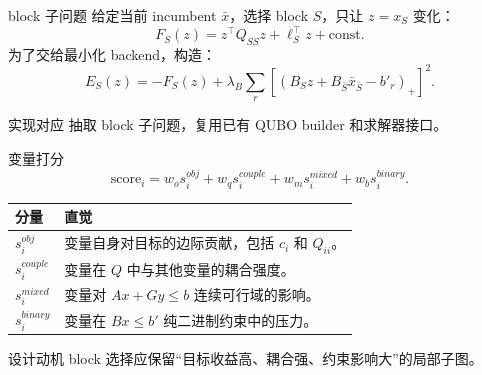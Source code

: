 \documentclass[aspectratio=169]{beamer}
\begin{document}
\begin{frame}{block 子问题}
\small
给定当前 incumbent $\bar{x}$，选择 block $S$，只让 $z=x_S$ 变化：
\[
F_S(z)=z^\top Q_{SS}z+\ell_S^\top z+\text{const}.
\]
为了交给最小化 backend，构造：
\[
E_S(z)=-F_S(z)+\lambda_B\sum_r
\left[\left(B_Sz+B_{\bar{S}}\bar{x}_{\bar{S}}-b'_r\right)_+\right]^2.
\]
\begin{block}{实现对应}
 抽取 block 子问题，复用已有 QUBO builder 和求解器接口。
\end{block}
\end{frame}

\begin{frame}{变量打分}
\small
\[
\text{score}_i
=w_o s_i^{obj}+w_q s_i^{couple}+w_m s_i^{mixed}+w_b s_i^{binary}.
\]
\vspace{1mm}
\begin{tabularx}{\linewidth}{p{3.0cm}Y}
\toprule
分量 & 直觉 \\
\midrule
$s_i^{obj}$ & 变量自身对目标的边际贡献，包括 $c_i$ 和 $Q_{ii}$。\\
$s_i^{couple}$ & 变量在 $Q$ 中与其他变量的耦合强度。\\
$s_i^{mixed}$ & 变量对 $Ax+Gy\le b$ 连续可行域的影响。\\
$s_i^{binary}$ & 变量在 $Bx\le b'$ 纯二进制约束中的压力。\\
\bottomrule
\end{tabularx}
\vspace{2mm}
\begin{alertblock}{设计动机}
block 选择应保留“目标收益高、耦合强、约束影响大”的局部子图。
\end{alertblock}
\end{frame}
\end{document}
